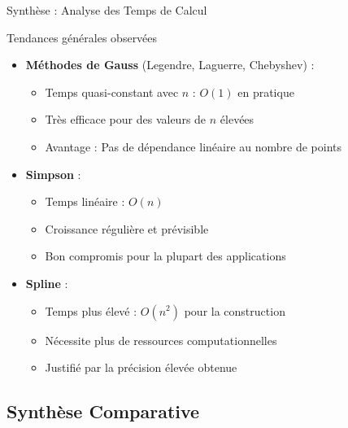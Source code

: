 \documentclass[aspectratio=169,11pt]{beamer}
\begin{document}
\begin{frame}{Synthèse : Analyse des Temps de Calcul}
\vspace{-0.2cm}
\begin{block}{Tendances générales observées}
\small
\begin{itemize}
\item \textbf{Méthodes de Gauss} (Legendre, Laguerre, Chebyshev) :
\begin{itemize}
\item Temps quasi-constant avec $n$ : $O(1)$ en pratique
\item Très efficace pour des valeurs de $n$ élevées
\item Avantage : Pas de dépendance linéaire au nombre de points
\end{itemize}
\item \textbf{Simpson} :
\begin{itemize}
\item Temps linéaire : $O(n)$
\item Croissance régulière et prévisible
\item Bon compromis pour la plupart des applications
\end{itemize}
\item \textbf{Spline} :
\begin{itemize}
\item Temps plus élevé : $O(n^2)$ pour la construction
\item Nécessite plus de ressources computationnelles
\item Justifié par la précision élevée obtenue
\end{itemize}
\end{itemize}
\end{block}
\end{frame}

\subsection{Synthèse Comparative}
\end{document}
